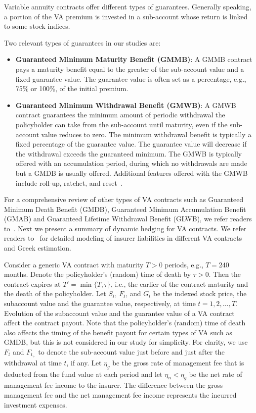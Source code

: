 \documentclass{article}
\begin{document}
Variable annuity contracts offer different types of guarantees.
Generally speaking, a portion of the VA premium is invested in a sub-account whose return is linked to some stock indices.

Two relevant types of guarantees in our studies are:
\begin{itemize}[noitemsep]
    \item \textbf{Guaranteed Minimum Maturity Benefit (GMMB)}: A GMMB contract pays a maturity benefit equal to the greater of the sub-account value and a fixed guarantee value.
    The guarantee value is often set as a percentage, e.g., 75\% or 100\%, of the initial premium.

    \item \textbf{Guaranteed Minimum Withdrawal Benefit (GMWB)}: A GMWB contract guarantees the minimum amount of periodic withdrawal the policyholder can take from the sub-account until maturity, even if the sub-account value reduces to zero.
    The minimum withdrawal benefit is typically a fixed percentage of the guarantee value.
    The guarantee value will decrease if the withdrawal exceeds the guaranteed minimum. The GMWB is typically offered with an accumulation period, during which no withdrawals are made but a GMDB is usually offered. Additional features offered with the GMWB include roll-up, ratchet, and reset~\citep{geneva2013variable}.
\end{itemize}
For a comprehensive review of other types of VA contracts such as Guaranteed Minimum Death Benefit (GMDB), Guaranteed Minimum Accumulation Benefit (GMAB) and Guaranteed Lifetime Withdrawal Benefit (GLWB), we refer readers to~\cite{hardy2003investment}.
Next we present a summary of dynamic hedging for VA contracts.
We refer readers to~\cite{dang2021efficient} for detailed modeling of insurer liabilities in different VA contracts and Greek estimation.

Consider a generic VA contract with maturity $T>0$ periods, e.g., $T=240$ months.
Denote the policyholder's (random) time of death by $\tau>0$.
Then the contract expires at $T'=\min\{T,\tau\}$, i.e., the earlier of the contract maturity and the death of the policyholder.
Let $S_t$, $F_t$, and $G_t$ be the indexed stock price, the subaccount value and the guarantee value, respectively, at time $t=1,2,\ldots,T$.
Evolution of the subaccount value and the guarantee value of a VA contract affect the contract payout.
Note that the policyholder's (random) time of death also affects the timing of the benefit payout for certain types of VA such as GMDB, but this is not considered in our study for simplicity.
For clarity, we use $F_t$ and $F_{t_+}$ to denote the sub-account value just before and just after the withdrawal at time $t$, if any.
Let $\eta_g$ be the gross rate of management fee that is deducted from the fund value at each period and let $\eta_n < \eta_g$ be the net rate of management fee income to the insurer.
The difference between the gross management fee and the net management fee income represents the incurred investment expenses.
\end{document}
